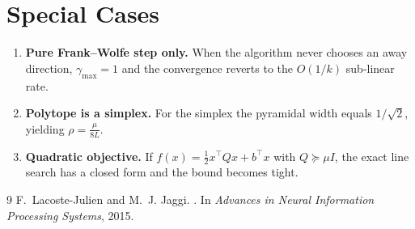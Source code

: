 \documentclass{article}
\begin{document}
\section*{Special Cases}
\begin{enumerate}
\item \textbf{Pure Frank–Wolfe step only.}  When the algorithm never
chooses an away direction, $\gamma_{\max}=1$ and the convergence reverts
to the $O(1/k)$ sub‑linear rate.
\item \textbf{Polytope is a simplex.}  For the simplex the pyramidal width
equals $1/\sqrt{2}$, yielding $\rho = \frac{\mu}{8L}$.
\item \textbf{Quadratic objective.}  If $f(x)=\tfrac12 x^{\top}Qx+b^{\top}x$ with
$Q\succeq \mu I$, the exact line search has a closed form and the bound
becomes tight.
\end{enumerate}


\begin{thebibliography}{9}
F.~Lacoste-Julien and M.~J. Jaggi.
.
\newblock In \emph{Advances in Neural Information Processing Systems},
  2015.
\end{thebibliography}
\end{document}
